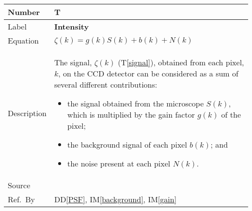 \documentclass[12pt]{article}
\newcommand{\colAwidth}{0.13\textwidth}
\newcommand{\colBwidth}{0.82\textwidth}
\newcommand{\ddref}[1]{DD\ref{#1}}
\newcounter{theorynum} %
\newcommand{\tref}[1]{T\ref{#1}}
\newcommand{\iref}[1]{IM\ref{#1}}
\begin{document}
\noindent
\begin{minipage}{\textwidth}
	\renewcommand*{\arraystretch}{1.5}
	\begin{tabular}{| p{\colAwidth} | p{\colBwidth}|}
		  \hline
		  \rowcolor[gray]{0.9}
		  Number& T{theorynum}\thetheorynum \label{intensity}\\
		  \hline
		  Label&\bf Intensity \\
		  \hline
		  Equation& $\zeta(k) = g(k) S(k) + b(k) + N(k)$ \\
		  \hline
		  Description & The signal, $\zeta(k)$ (\tref{signal}), obtained from each
pixel, $k$, on the CCD detector can be considered as a sum of several different
contributions: 
		  \begin{itemize}
			\item the signal obtained from the microscope $S(k)$, which is multiplied by
the gain factor $g(k)$ of the pixel; 
			\item the background signal of each pixel $b(k)$; and
			\item the noise present at each pixel $N(k)$.
		  \end{itemize}\\
		  \hline
		  Source & \cite{zuo_electron_2000}\\
		  \hline
		  Ref.\ By & \ddref{PSF}, \iref{background}, \iref{gain} \\
		  \hline
	\end{tabular}
\end{minipage}\\

~\newline
\end{document}
